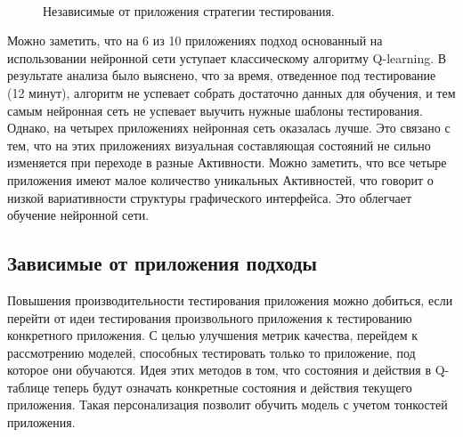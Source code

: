 \begin{figure}[h!]
\centering
{} \\
\caption{Независимые от приложения стратегии тестирования.}
\label{app_free_picture}
\end{figure}

Можно заметить, что на 6 из 10 приложениях подход основанный на использовании нейронной сети уступает классическому алгоритму Q-learning. В результате анализа было выяснено, что за время, отведенное под тестирование (12 минут), алгоритм не успевает собрать достаточно данных для обучения, и тем самым нейронная сеть не успевает выучить нужные шаблоны тестирования. Однако, на четырех приложениях нейронная сеть оказалась лучше. Это связано с тем, что на этих приложениях визуальная составляющая состояний не сильно изменяется при переходе в разные Активности. Можно заметить, что все четыре приложения имеют малое количество уникальных Активностей, что говорит о низкой вариативности структуры графического интерфейса. Это облегчает обучение нейронной сети.

\subsection{Зависимые от приложения подходы}

Повышения производительности тестирования приложения можно добиться, если перейти от идеи тестирования произвольного приложения к тестированию конкретного приложения. С целью улучшения метрик качества, перейдем к рассмотрению моделей, способных тестировать только то приложение, под которое они обучаются. Идея этих методов в том, что состояния и действия в Q-таблице теперь будут означать конкретные состояния и действия текущего приложения. Такая персонализация позволит обучить модель с учетом тонкостей приложения.

